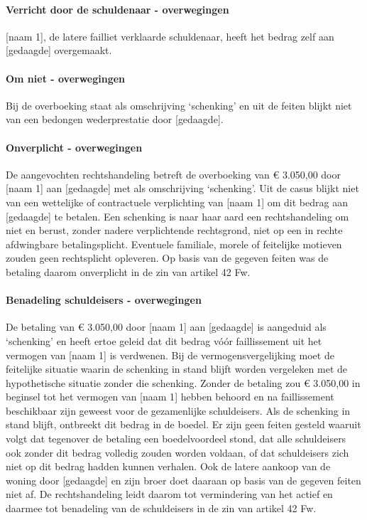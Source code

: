 \documentclass[
  dutch,
  a4paper,
]{article}
\begin{document}
\paragraph{Verricht door de schuldenaar - overwegingen}\label{verricht-door-de-schuldenaar---overwegingen-28}

{[}naam 1{]}, de latere failliet verklaarde schuldenaar, heeft het bedrag zelf aan {[}gedaagde{]} overgemaakt.

\paragraph{Om niet - overwegingen}\label{om-niet---overwegingen-28}

Bij de overboeking staat als omschrijving `schenking' en uit de feiten blijkt niet van een bedongen wederprestatie door {[}gedaagde{]}.

\paragraph{Onverplicht - overwegingen}\label{onverplicht---overwegingen-28}

De aangevochten rechtshandeling betreft de overboeking van € 3.050,00 door {[}naam 1{]} aan {[}gedaagde{]} met als omschrijving `schenking'. Uit de casus blijkt niet van een wettelijke of contractuele verplichting van {[}naam 1{]} om dit bedrag aan {[}gedaagde{]} te betalen. Een schenking is naar haar aard een rechtshandeling om niet en berust, zonder nadere verplichtende rechtsgrond, niet op een in rechte afdwingbare betalingsplicht. Eventuele familiale, morele of feitelijke motieven zouden geen rechtsplicht opleveren. Op basis van de gegeven feiten was de betaling daarom onverplicht in de zin van artikel 42 Fw.

\paragraph{Benadeling schuldeisers - overwegingen}\label{benadeling-schuldeisers---overwegingen-28}

De betaling van € 3.050,00 door {[}naam 1{]} aan {[}gedaagde{]} is aangeduid als `schenking' en heeft ertoe geleid dat dit bedrag vóór faillissement uit het vermogen van {[}naam 1{]} is verdwenen. Bij de vermogensvergelijking moet de feitelijke situatie waarin de schenking in stand blijft worden vergeleken met de hypothetische situatie zonder die schenking. Zonder de betaling zou € 3.050,00 in beginsel tot het vermogen van {[}naam 1{]} hebben behoord en na faillissement beschikbaar zijn geweest voor de gezamenlijke schuldeisers. Als de schenking in stand blijft, ontbreekt dit bedrag in de boedel. Er zijn geen feiten gesteld waaruit volgt dat tegenover de betaling een boedelvoordeel stond, dat alle schuldeisers ook zonder dit bedrag volledig zouden worden voldaan, of dat schuldeisers zich niet op dit bedrag hadden kunnen verhalen. Ook de latere aankoop van de woning door {[}gedaagde{]} en zijn broer doet daaraan op basis van de gegeven feiten niet af. De rechtshandeling leidt daarom tot vermindering van het actief en daarmee tot benadeling van de schuldeisers in de zin van artikel 42 Fw.
\end{document}
